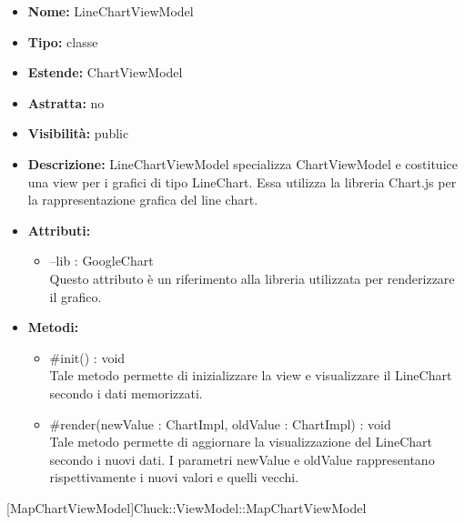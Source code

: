 			
			\begin{itemize}
			\item \textbf{Nome:} LineChartViewModel
			\item \textbf{Tipo:} classe
			
		\item \textbf{Estende:}
		ChartViewModel
		\item \textbf{Astratta:}
		no
			\item \textbf{Visibilità:} public
			\item \textbf{Descrizione:} LineChartViewModel specializza ChartViewModel e costituice una view per i grafici di tipo LineChart. Essa utilizza la libreria Chart.js per la rappresentazione grafica del line chart.
			\item \textbf{Attributi:}
				\begin{itemize}
				\setlength{\itemsep}{5pt}
				
					\item[\ding{111}] {--lib : GoogleChart} \\ [1mm] Questo attributo è un riferimento alla libreria utilizzata per renderizzare il grafico.
				\end{itemize}
		
			\item \textbf{Metodi:}
				\begin{itemize}
				\setlength{\itemsep}{5pt}
				
					\item[\ding{111}] {{\#init() : void}} \\ [1mm] Tale metodo permette di inizializzare la view e visualizzare il LineChart secondo i dati memorizzati.
					\item[\ding{111}] {{\#render(newValue : ChartImpl, oldValue : ChartImpl) : void}} \\ [1mm] Tale metodo permette di aggiornare la visualizzazione del LineChart secondo i nuovi dati. I parametri newValue e oldValue rappresentano rispettivamente i nuovi valori e quelli vecchi.
				\end{itemize}
		
			\end{itemize}

			
			[MapChartViewModel]{Chuck::ViewModel::MapChartViewModel}
			

	
